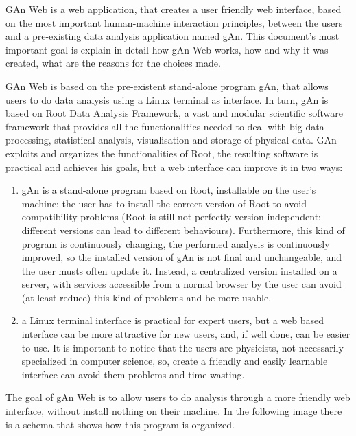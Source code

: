 GAn Web is a web application, that creates a user friendly web interface, based on the most important human-machine interaction principles, between the users and a pre-existing data analysis application named gAn.
This document's most important goal is explain in detail how gAn Web works, how and why it was created, what are the reasons for the choices made. 

GAn Web is based on the pre-existent stand-alone program gAn, that allows users to do data analysis using a Linux terminal as interface. In turn, gAn is based on Root Data Analysis Framework, a vast and modular scientific software framework that provides all the functionalities needed to deal with big data processing, statistical analysis, visualisation and storage of physical data. GAn exploits and organizes the functionalities of Root, the resulting software is practical and achieves his goals, but a web interface can improve it in two ways:

\begin{enumerate}

\item gAn is a stand-alone program based on Root, installable on the user's machine; the user has to install the correct version of Root to avoid compatibility problems (Root is still not perfectly version independent: different versions can lead to different behaviours). Furthermore, this kind of program is continuously changing, the performed analysis is continuously improved, so the installed version of gAn is not final and unchangeable, and the user musts often update it. Instead, a centralized version installed on a server, with services accessible from a normal browser by the user can avoid (at least reduce) this kind of problems and be more usable.    
 

\item a Linux terminal interface is practical for expert users, but a web based interface can be more attractive for new users, and, if well done, can be easier to use. It is important to notice that the users are physicists, not necessarily specialized in computer science, so, create a friendly and easily learnable interface can avoid them problems and time wasting.   


\end{enumerate}


The goal of gAn Web is to allow users to do analysis through a more friendly web interface, without install nothing on their machine. In the following image there is a schema that shows how this program is organized.

